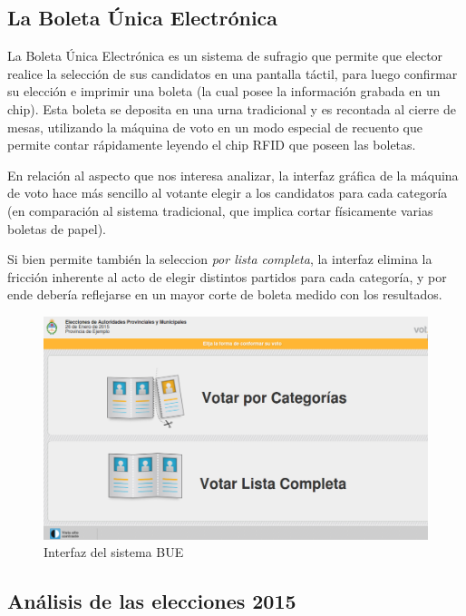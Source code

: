\documentclass[12pt,a4paper]{article}
\begin{document}
\subsection{La Boleta Única Electrónica}
La Boleta Única Electrónica es un sistema de sufragio que permite que elector
realice la selección de sus candidatos en una pantalla táctil, para luego
confirmar su elección e imprimir una boleta (la cual posee la información
grabada en un chip). Esta boleta se deposita en una urna tradicional y es
recontada al cierre de mesas, utilizando la máquina de voto en un modo especial
de recuento que permite contar rápidamente leyendo el chip RFID que poseen las boletas.

En relación al aspecto que nos interesa analizar, la interfaz gráfica de la
máquina de voto hace más sencillo al votante elegir a los candidatos para cada
categoría (en comparación al sistema tradicional, que implica cortar físicamente
varias boletas de papel).

Si bien permite también la seleccion \emph{por lista completa}, la interfaz
elimina la fricción inherente al acto de elegir distintos partidos para cada
categoría, y por ende debería reflejarse en un mayor corte de boleta medido con
los resultados.

\begin{figure}[h]
\centering
    \includegraphics[width=\textwidth]{interfaz_bue}
\caption{Interfaz del sistema BUE}
\end{figure}

\subsection{Análisis de las elecciones 2015}
\end{document}
